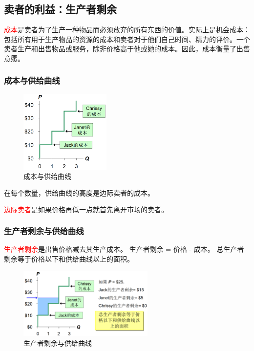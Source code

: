 \documentclass[12pt, a4paper]{article}
\begin{document}
\subsection{卖者的利益：生产者剩余}

\textcolor{red}{成本}是卖者为了生产一种物品而必须放弃的所有东西的价值。实际上是机会成本：包括所有用于生产物品的资源的成本和卖者对于他们自己时间、精力的评价。一个卖者生产和出售物品或服务，除非价格高于他或她的成本。因此，成本衡量了出售意愿。

\subsubsection{成本与供给曲线}

\begin{figure}[H]
  \centering
  \includegraphics[width=0.4\textwidth]{成本与供给曲线.png}
  \caption{成本与供给曲线}
\end{figure}

在每个数量，供给曲线的高度是边际卖者的成本。

\textcolor{red}{边际卖者}是如果价格再低一点就首先离开市场的卖者。

\subsubsection{生产者剩余与供给曲线}

\textcolor{red}{生产者剩余}是出售价格减去其生产成本。
生产者剩余 = 价格 - 成本。
总生产者剩余等于价格以下和供给曲线以上的面积。

\begin{figure}[H]
  \centering
  \includegraphics[width=0.6\textwidth]{生产者剩余与供给曲线.png}
  \caption{生产者剩余与供给曲线}
\end{figure}
\end{document}
